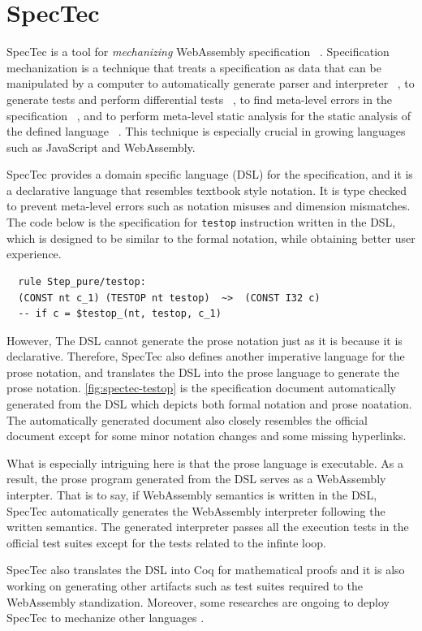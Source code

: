\section{SpecTec}
\label{sec:spectec}


SpecTec is a tool for \textit{mechanizing} WebAssembly specification
~\cite{spectec}.
Specification mechanization is a technique that treats a specification as data
that can be manipulated by a computer to automatically generate parser and
interpreter ~\cite{jiset}, to generate tests and perform differential tests
~\cite{jest}, to find meta-level errors in the specification ~\cite{jstar}, and
to perform meta-level static analysis for the static analysis of the defined
language ~\cite{jsaver}.
This technique is especially crucial in growing languages such as JavaScript
and WebAssembly.


SpecTec provides a domain specific language (DSL) for the specification, and it
is a declarative language that resembles textbook style notation.
It is type checked to prevent meta-level errors such as notation misuses and
dimension mismatches. The code below is the specification for \texttt{testop}
instruction written in the DSL, which is designed to be similar to the formal
notation, while obtaining better user experience. \\
\begin{verbatim}
  rule Step_pure/testop:
  (CONST nt c_1) (TESTOP nt testop)  ~>  (CONST I32 c)
  -- if c = $testop_(nt, testop, c_1)
\end{verbatim}


However, The DSL cannot generate the prose notation just as it is because it is
declarative.
Therefore, SpecTec also defines another imperative language for the prose
notation, and translates the DSL into the prose language to generate the prose
notation.
\cref{fig:spectec-testop} is the specification document automatically generated
from the DSL which depicts both formal notation and prose noatation.
The automatically generated document also closely resembles the official
document except for some minor notation changes and some missing hyperlinks.


What is especially intriguing here is that the prose language is executable.
As a result, the prose program generated from the DSL serves as a WebAssembly
interpter.
That is to say, if WebAssembly semantics is written in the DSL, SpecTec
automatically generates the WebAssembly interpreter following the written
semantics.
The generated interpreter passes all the execution tests in the official test
suites except for the tests related to the infinte loop.


SpecTec also translates the DSL into Coq\cite{il2coq} for mathematical proofs
and it is also working on generating other artifacts such as test suites
required to the WebAssembly standization.
Moreover, some researches are ongoing to deploy SpecTec to mechanize other
languages \cite{p4-cherry-workshop}.
